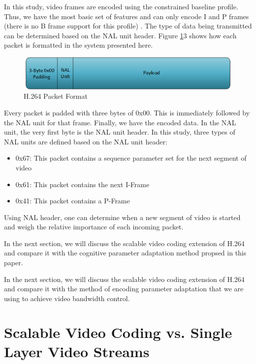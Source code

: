 \documentclass[preprint, 12pt]{elsarticle}
\begin{document}
In this study, video frames are encoded using the constrained baseline profile. Thus, we have the most basic set of features and can only encode I and P frames (there is no B frame support for this profile) \cite{H264Spec}. The type of data being transmitted can be determined based on the NAL unit header. Figure \ref{fig:H264PacketFormat}3 shows how each packet is formatted in the system presented here.
\begin{figure}[h]
\centering
\includegraphics[width=0.8\linewidth]{H264HeaderFormat.png}
\caption{H.264 Packet Format}
\label{fig:H264PacketFormat}
\end{figure}
Every packet is padded with three bytes of 0x00. This is immediately followed by the NAL unit for that frame. Finally, we have the encoded data. In the NAL unit, the very first byte is the NAL unit header. In this study, three types of NAL units are defined based on the NAL unit header:
\begin{itemize}
\item 0x67: This packet contains a sequence parameter set for the next segment of video
\item 0x61: This packet contains the next I-Frame
\item 0x41: This packet contains a P-Frame
\end{itemize}
Using NAL header, one can determine when a new segment of video is started and weigh the relative importance of each incoming packet. 

In the next section, we will discuss the scalable video coding extension of H.264 and compare it with the cognitive parameter adaptation method propsed in this paper.

In the next section, we will discuss the scalable video coding extension of H.264 and compare it with the method of encoding parameter adaptation that we are using to achieve video bandwidth control.


\section{Scalable Video Coding vs. Single Layer Video Streams}
\label{sec:SVC}
\end{document}
